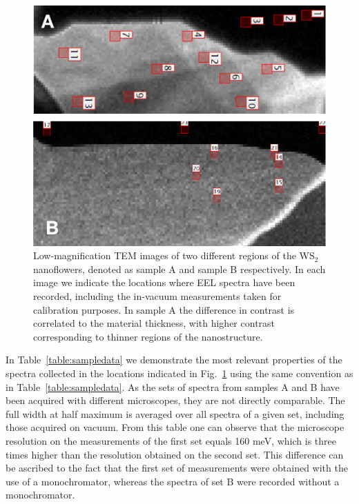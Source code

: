 {%
\begin{figure}[t]
\begin{centering}
  \includegraphics[width=0.87\linewidth]{plots/Spectra_location.pdf}
  \caption{Low-magnification TEM images of two different regions of
    the WS$_2$ nanoflowers, denoted as sample A and sample B respectively.
    In each image we indicate the locations where
    EEL spectra have been recorded, including the in-vacuum measurements taken
    for calibration purposes.
    In sample A the difference in contrast is correlated to the material
    thickness, with higher contrast corresponding to thinner regions of the nanostructure.
  }
\label{fig:ws2positions}
\end{centering}
\end{figure}

In Table~\ref{table:sampledata} we demonstrate the most relevant properties of the spectra collected
in the locations indicated in Fig.~\ref{fig:ws2positions} using the same convention as
in Table~\ref{table:sampledata}.
%
As the sets of spectra from samples A and B
have been acquired with different microscopes, they are
not directly comparable.
%
The full width at half maximum is averaged over all spectra of a given set,
including those acquired on vacuum.
%
From this table one can observe that the microscope resolution on the measurements of the first set equals 160 meV, 
which is three times higher
than the resolution obtained on the second set. 
%
This difference can be ascribed to the fact that the first set of measurements were obtained with the use of a 
monochromator, whereas the spectra of set B were recorded without a monochromator.
%

}
